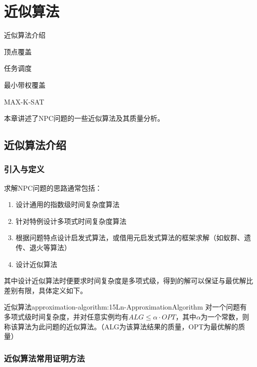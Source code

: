 \chapter{近似算法}

\begin{introduction}
	\item 近似算法介绍
	\item 顶点覆盖
	\item 任务调度
	\item 最小带权覆盖
	\item MAX-K-SAT
\end{introduction}

本章讲述了NPC问题的一些近似算法及其质量分析。

\section{近似算法介绍}

\subsection{引入与定义}

求解NPC问题的思路通常包括：
\begin{enumerate}
	\item 设计通用的指数级时间复杂度算法
	\item 针对特例设计多项式时间复杂度算法
	\item 根据问题特点设计启发式算法，或借用元启发式算法的框架求解（如蚁群、遗传、退火等算法）
	\item 设计近似算法
\end{enumerate}
其中设计近似算法时便要求时间复杂度是多项式级，得到的解可以保证与最优解比差别有限，具体定义如下。

\begin{definition}{近似算法}{approximation-algorithm:15Ln-ApproximationAlgorithm}
	对一个问题有多项式级时间复杂度，并对任意实例均有$ALG\leqslant \alpha \cdot OPT$，其中$\alpha$为一个常数，则称该算法为此问题的近似算法。（ALG为该算法结果的质量，OPT为最优解的质量）
\end{definition}

\subsection{近似算法常用证明方法}

